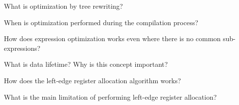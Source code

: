 \begin{Exercise}
What is optimization by tree rewriting?
\end{Exercise}

\begin{Exercise}
When is optimization performed during the compilation process?
\end{Exercise}

\begin{Exercise}
How does expression optimization works even where there is no common sub-expressions?
\end{Exercise}

\begin{Exercise}[difficulty=1]
What is data lifetime? Why is this concept important?
\end{Exercise}

\begin{Exercise}
How does the left-edge register allocation algorithm works?
\end{Exercise}

\begin{Exercise}
What is the main limitation of performing left-edge register allocation?
\end{Exercise}